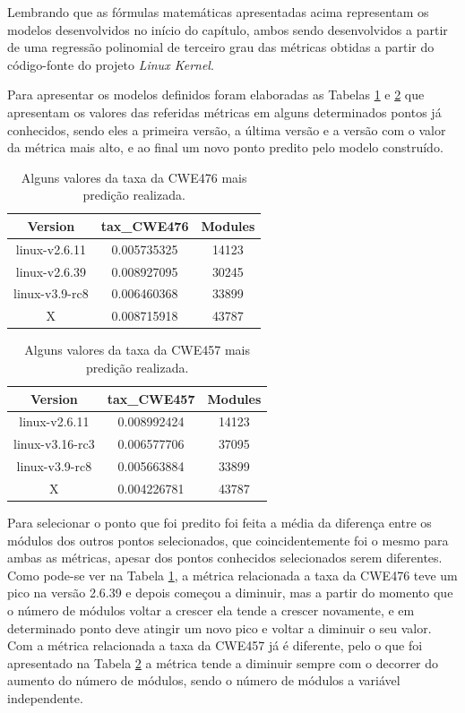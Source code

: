 Lembrando que as fórmulas matemáticas apresentadas acima representam os modelos
desenvolvidos no início do capítulo, ambos sendo desenvolvidos a
partir de uma regressão polinomial de terceiro grau das métricas obtidas a
partir do código-fonte do projeto \textit{Linux Kernel}.

Para apresentar os modelos definidos foram elaboradas as Tabelas
\ref{tab:cwe476} e \ref{tab:cwe457} que apresentam os valores das referidas
métricas em alguns determinados pontos já conhecidos, sendo eles a primeira
versão, a última versão e a versão com o valor da métrica mais alto, e ao final
um novo ponto predito pelo modelo construído.

\begin{table}[h]
\centering
\begin{tabular}{ccc}
\hline
\rowcolor[HTML]{EFEFEF} 
{Version}  & {tax\_CWE476} & {Modules} \\ \hline
linux-v2.6.11  & 0.005735325       & 14123         \\ \hline
linux-v2.6.39  & 0.008927095       & 30245         \\ \hline
linux-v3.9-rc8 & 0.006460368       & 33899         \\ \hline
X              & 0.008715918       & 43787         \\ \hline
\end{tabular}
\caption{Alguns valores da taxa da CWE476 mais predição realizada.}
\label{tab:cwe476}
\end{table}

\begin{table}[h]
\centering
\begin{tabular}{ccc}
\hline
\rowcolor[HTML]{EFEFEF} 
{Version}   & {tax\_CWE457} & {Modules} \\ \hline
linux-v2.6.11   & 0.008992424       & 14123         \\ \hline
linux-v3.16-rc3 & 0.006577706       & 37095         \\ \hline
linux-v3.9-rc8  & 0.005663884       & 33899         \\ \hline
X               & 0.004226781       & 43787         \\ \hline
\end{tabular}
\caption{Alguns valores da taxa da CWE457 mais predição realizada.}
\label{tab:cwe457}
\end{table}

Para selecionar o ponto que foi predito foi feita a média da diferença entre os
módulos dos outros pontos selecionados, que coincidentemente foi o mesmo para
ambas as métricas, apesar dos pontos conhecidos selecionados serem diferentes.
Como pode-se ver na Tabela \ref{tab:cwe476}, a métrica relacionada a taxa da
CWE476 teve um pico na versão 2.6.39 e depois começou a diminuir, mas a partir do
momento que o número de módulos voltar a crescer ela tende a crescer novamente,
e em determinado ponto deve atingir um novo pico e voltar a diminuir o seu
valor. Com a métrica relacionada a taxa da CWE457 já é diferente, pelo o que foi
apresentado na Tabela \ref{tab:cwe457} a métrica tende a diminuir sempre com o
decorrer do aumento do número de módulos, sendo o número de módulos a variável
independente.


